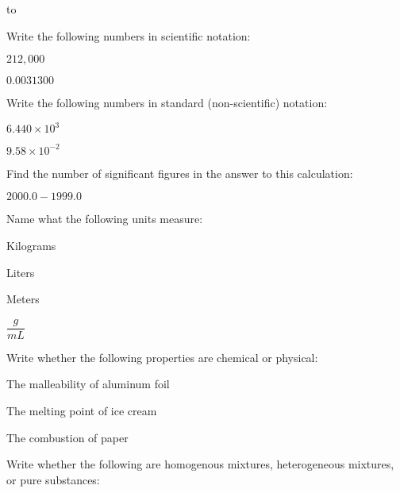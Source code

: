 \documentclass[11pt]{exam}
\begin{document}
\vspace{0.1in} 
\hbox to \textwidth{Name:\enspace\hrulefill} 

\begin{questions}

\question Write the following numbers in scientific notation:
\vspace{5mm}

$212,000$
\vspace{5mm}

$0.0031300$
\vspace{5mm}

\question Write the following numbers in standard (non-scientific) notation:
\vspace{5mm}

$6.440 \times 10^3$
\vspace{5mm}

$9.58 \times 10^{-2}$
\vspace{5mm}

\question Find the number of significant figures in the answer to this calculation:
\vspace{5mm}

$2000.0 - 1999.0$
\vspace{5mm}

\question Name what the following units measure:
\vspace{5mm}

Kilograms
\vspace{5mm}

Liters
\vspace{5mm}

Meters
\vspace{5mm}

$\dfrac{g}{mL}$
\vspace{5mm}

\question Write whether the following properties are chemical or physical:
\vspace{5mm}

The malleability of aluminum foil
\vspace{5mm}

The melting point of ice cream
\vspace{5mm}

The combustion of paper
\vspace{5mm}

\pagebreak
\question Write whether the following are homogenous mixtures, heterogeneous mixtures, or pure substances:
\vspace{5mm}


\end{questions}
\end{document}
